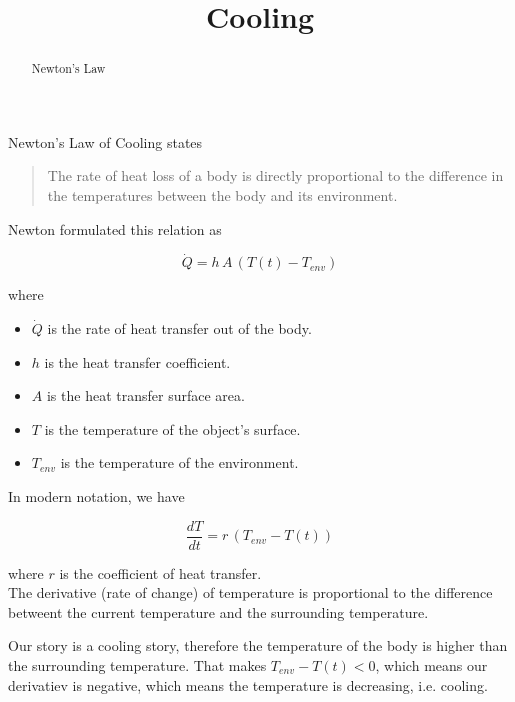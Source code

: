 \documentclass{ximera}
\title{Cooling}
\begin{document}
\begin{abstract}
  Newton's Law
\end{abstract}
\maketitle




Newton's Law of Cooling states



\begin{quote}


The rate of heat loss of a body is directly proportional to the difference in the temperatures between the body and its environment. 
\end{quote}



Newton formulated this relation as 

\[
\dot{Q} = h \, A \, (T(t) - T_{env})
\]


where


\begin{itemize}
\item $\dot{Q}$ is the rate of heat transfer out of the body.
\item $h$ is the  heat transfer coefficient.
\item $A$ is the heat transfer surface area.
\item $T$ is the temperature of the object's surface.
\item $T_{env}$ is the temperature of the environment.
\end{itemize}



In modern notation, we have

\[
\frac{dT}{dt} = r \, (T_{env} - T(t))
\]

where $r$ is the coefficient of heat transfer.\\





The derivative (rate of change) of temperature is proportional to the difference betweent the current temperature and the surrounding temperature.


\begin{observation}


Our story is a cooling story, therefore the temperature of the body is higher than the surrounding temperature.  That makes $T_{env} - T(t) < 0$, which means our derivatiev is negative, which means the temperature is decreasing, i.e. cooling.
\end{observation}
\end{document}
